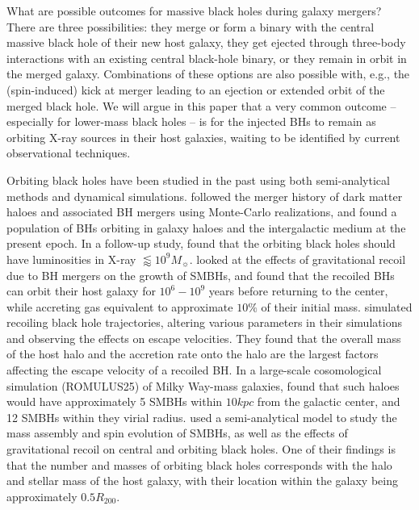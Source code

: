 \documentclass[fleqn,usenatbib,useAMS]{mnras}
\begin{document}
What are possible outcomes for massive black holes during galaxy mergers?  There are three possibilities: they merge or form a binary with the central massive black hole of their new host galaxy, they get ejected through three-body interactions with an existing central black-hole binary, or they remain in orbit in the merged galaxy.  Combinations of these options are also possible with, e.g., the (spin-induced) kick at merger leading to an ejection or extended orbit of the merged black hole. We will argue in this paper that a very common outcome -- especially for lower-mass black holes -- is for the injected BHs to remain as orbiting X-ray sources in their host galaxies, waiting to be identified by current observational techniques.

Orbiting black holes have been studied in the past using both semi-analytical methods and dynamical simulations.  \citet{2003ApJ...582..559V} followed the merger history of dark matter haloes and associated BH mergers using Monte-Carlo realizations, and found a population of BHs orbiting in galaxy haloes and the intergalactic medium at the present epoch.  In a follow-up study, \citet{2005MNRAS.358..913V} found that the orbiting black holes should have luminosities in X-ray $\lessapprox10^9 M_{\sun}$.  \citet{2008MNRAS.390.1311B} looked at the effects of gravitational recoil due to BH mergers on the growth of SMBHs, and found that the recoiled BHs can orbit their host galaxy for $10^6-10^9$ years before returning to the center, while accreting gas equivalent to approximate $10{\%}$ of their initial mass.  \citet{2017MNRAS.472.1526C} simulated recoiling black hole trajectories, altering various parameters in their simulations and observing the effects on escape velocities.  They found that the overall mass of the host halo and the accretion rate onto the halo are the largest factors affecting the escape velocity of a recoiled BH.  In a large-scale cosomological simulation (ROMULUS25) of Milky Way-mass galaxies, \citet{2018ApJ...857L..22T} found that such haloes would have approximately 5 SMBHs within $10kpc$ from the galactic center, and 12 SMBHs within they virial radius.  \citet{2020MNRAS.495.4681I} used a semi-analytical model to study the mass assembly and spin evolution of SMBHs, as well as the effects of gravitational recoil on central and orbiting black holes.  One of their findings is that the number and masses of orbiting black holes corresponds with the halo and stellar mass of the host galaxy, with their location within the galaxy being approximately $0.5R_{200}$.
\end{document}
